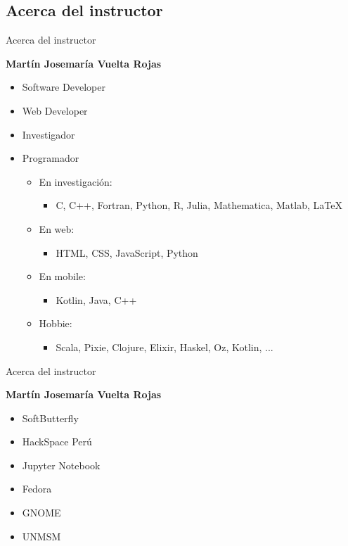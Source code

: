 \subsection{Acerca del instructor}
\begin{frame}[fragile]{Acerca del instructor}
  \begin{center}
    \textbf{Martín Josemaría Vuelta Rojas}
  \end{center}

  \begin{itemize}[<+(1)->]
    \item Software Developer
    \item Web Developer
    \item Investigador
    \item Programador
    \begin{itemize}
      \item En investigación:
        \begin{itemize}
          \item C, C++, Fortran, Python, R, Julia, Mathematica, Matlab, LaTeX
        \end{itemize}
      \item En web:
        \begin{itemize}
          \item HTML, CSS, JavaScript, Python
        \end{itemize}
      \item En mobile:
        \begin{itemize}
          \item Kotlin, Java, C++
        \end{itemize}
      \item Hobbie:
        \begin{itemize}
          \item Scala, Pixie, Clojure, Elixir, Haskel, Oz, Kotlin, ...
        \end{itemize}
    \end{itemize}
  \end{itemize}
\end{frame}

\begin{frame}[fragile]{Acerca del instructor}
  \begin{center}
    \textbf{Martín Josemaría Vuelta Rojas}
  \end{center}

  \begin{itemize}[<+(1)->]
    \item SoftButterfly
    \item HackSpace Perú
    \item Jupyter Notebook
    \item Fedora
    \item GNOME
    \item UNMSM
  \end{itemize}
\end{frame}

